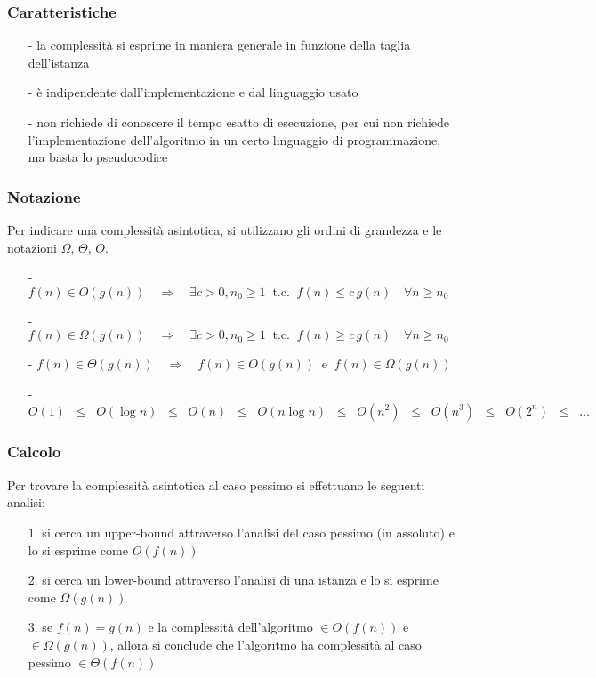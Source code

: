 \documentclass[a4paper]{article}
\begin{document}
\subsubsection*{Caratteristiche}
\begin{itemize}[topsep=3pt, itemsep=0pt]
	\item[-] la complessità si esprime in maniera generale in funzione della taglia dell'istanza
	\item[-] è indipendente dall'implementazione e dal linguaggio usato
	\item[-] non richiede di conoscere il tempo esatto di esecuzione, per cui non richiede l'implementazione dell'algoritmo in
	un certo linguaggio di programmazione, ma basta lo pseudocodice
\end{itemize}

\subsubsection*{Notazione}
Per indicare una complessità asintotica, si utilizzano gli ordini di grandezza e le notazioni \(\Omega\), \(\Theta\), \(O\).
\begin{itemize}[topsep=3pt, itemsep=0pt]
	\item[-] \(f(n) \in O(g(n)) \quad \Rightarrow \quad \exists c > 0, n_0 \geq 1 \;\; \text{t.c.} \;\; f(n) \leq c \, g(n) \quad \forall n \geq n_0\)
	\item[-] \(f(n) \in \Omega(g(n)) \quad \Rightarrow \quad \exists c > 0, n_0 \geq 1 \;\; \text{t.c.} \;\; f(n) \geq c \, g(n) \quad \forall n \geq n_0\)
	\item[-] \(f(n) \in \Theta(g(n)) \quad \Rightarrow \quad f(n) \in O(g(n)) \;\; \text{e} \;\; f(n) \in \Omega(g(n))\)
	\item[-] \(O(1) \; \; \leq \; \; O(\log n) \; \; \leq \; \; O(n) \; \; \leq \; \; O(n \log n) \; \; \leq \; \; O(n^2) \; \; \leq \; \; O(n^3) \; \; \leq \; \; O(2^n) \;\; \leq \;\; \dots\)
\end{itemize}

\subsubsection*{Calcolo}
Per trovare la complessità asintotica al caso pessimo si effettuano le seguenti analisi:
\begin{itemize}[topsep=3pt, itemsep=0pt]
	\item[1.] si cerca un upper-bound attraverso l'analisi del caso pessimo (in assoluto) e lo si esprime come \(O(f(n))\)
	\item[2.] si cerca un lower-bound attraverso l'analisi di una istanza  e lo si esprime come \(\Omega(g(n))\)
	\item[3.] se \(f(n) = g(n)\) e la complessità dell'algoritmo \(\in O(f(n))\) e \(\in \Omega(g(n))\), allora si conclude che
	l'algoritmo ha complessità al caso pessimo \(\in \Theta(f(n))\)
\end{itemize}
\end{document}
